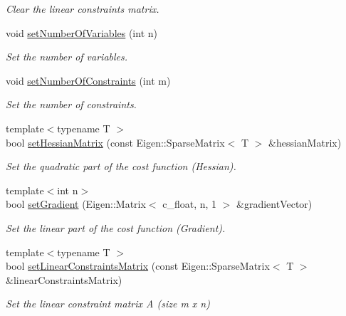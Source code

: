 \begin{DoxyCompactItemize}
\begin{DoxyCompactList}\small\item\em Clear the linear constraints matrix. \end{DoxyCompactList}\item 
void \mbox{\hyperlink{classOsqpEigen_1_1Data_abd09d8d70fcbaa8db833b87ca0bcbbab}{set\+Number\+Of\+Variables}} (int n)
\begin{DoxyCompactList}\small\item\em Set the number of variables. \end{DoxyCompactList}\item 
void \mbox{\hyperlink{classOsqpEigen_1_1Data_aea746479660e90e46fbf185dca91d936}{set\+Number\+Of\+Constraints}} (int m)
\begin{DoxyCompactList}\small\item\em Set the number of constraints. \end{DoxyCompactList}\item 
{\footnotesize template$<$typename T $>$ }\\bool \mbox{\hyperlink{classOsqpEigen_1_1Data_a58dfe4bfbb1b843736496eea9d0acfb7}{set\+Hessian\+Matrix}} (const Eigen\+::\+Sparse\+Matrix$<$ T $>$ \&hessian\+Matrix)
\begin{DoxyCompactList}\small\item\em Set the quadratic part of the cost function (Hessian). \end{DoxyCompactList}\item 
{\footnotesize template$<$int n$>$ }\\bool \mbox{\hyperlink{classOsqpEigen_1_1Data_a46b476556b8f71326c6827285f10b970}{set\+Gradient}} (Eigen\+::\+Matrix$<$ c\+\_\+float, n, 1 $>$ \&gradient\+Vector)
\begin{DoxyCompactList}\small\item\em Set the linear part of the cost function (Gradient). \end{DoxyCompactList}\item 
{\footnotesize template$<$typename T $>$ }\\bool \mbox{\hyperlink{classOsqpEigen_1_1Data_a202b1b554cad83590bf9999b1ffdf6c5}{set\+Linear\+Constraints\+Matrix}} (const Eigen\+::\+Sparse\+Matrix$<$ T $>$ \&linear\+Constraints\+Matrix)
\begin{DoxyCompactList}\small\item\em Set the linear constraint matrix A (size m x n) \end{DoxyCompactList}\item 

\end{DoxyCompactItemize}
